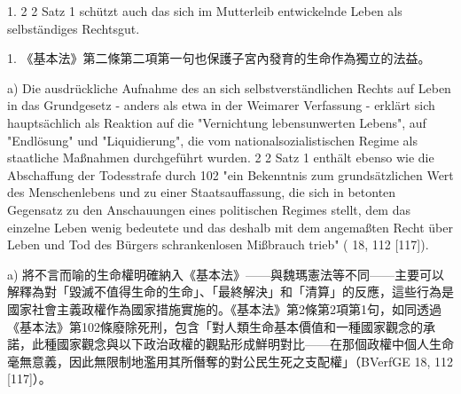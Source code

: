 \documentclass[12pt]{article}
\begin{document}
\syncleft
\begin{sourcepara}
1. \abbrArt{} 2 \abbrAbs{} 2 Satz 1 \abbrGG{}\ggfnArtTwoTwoOneDE{} schützt auch das sich im Mutterleib entwickelnde Leben als selbständiges Rechtsgut.
\end{sourcepara}
\begin{transpara}
1. 《基本法》第二條第二項第一句\ggfnArtTwoTwoOneZH{}也保護子宮內發育的生命作為獨立的法益。
\end{transpara}

\syncleft
\begin{sourcepara}
a) Die ausdrückliche Aufnahme des an sich selbstverständlichen Rechts auf Leben in das Grundgesetz - anders als etwa in der Weimarer Verfassung - erklärt sich hauptsächlich als Reaktion auf die "Vernichtung lebensunwerten Lebens", auf "Endlösung" und "Liquidierung", die vom nationalsozialistischen Regime als staatliche Maßnahmen durchgeführt wurden. \abbrArt{} 2 \abbrAbs{} 2 Satz 1 \abbrGG{}\ggfnArtTwoTwoOneDE{} enthält ebenso wie die Abschaffung der Todesstrafe durch \abbrArt{} 102\ggfnArtOneZeroTwoDE{} \abbrGG{} "ein Bekenntnis zum grundsätzlichen Wert des Menschenlebens und zu einer Staatsauffassung, die sich in betonten Gegensatz zu den Anschauungen eines politischen Regimes stellt, dem das einzelne Leben wenig bedeutete und das deshalb mit dem angemaßten Recht über Leben und Tod des Bürgers schrankenlosen Mißbrauch trieb" (\abbrBVerfGE{} 18, 112 [117]).
\end{sourcepara}
\begin{transpara}
a) 將不言而喻的生命權明確納入《基本法》——與魏瑪憲法等不同——主要可以解釋為對「毀滅不值得生命的生命」、「最終解決」和「清算」的反應，這些行為是國家社會主義政權作為國家措施實施的。《基本法》第2條第2項第1句，如同透過《基本法》第102條\ggfnArtOneZeroTwoZH{}廢除死刑，包含「對人類生命基本價值和一種國家觀念的承諾，此種國家觀念與以下政治政權的觀點形成鮮明對比——在那個政權中個人生命毫無意義，因此無限制地濫用其所僭奪的對公民生死之支配權」（BVerfGE 18, 112 [117]）。
\end{transpara}
\end{document}
